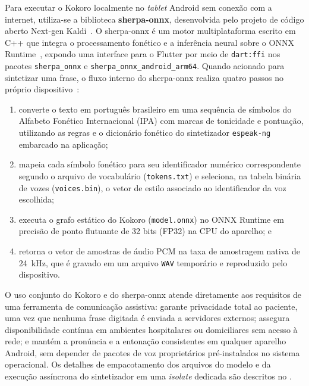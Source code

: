 Para executar o Kokoro localmente no \textit{tablet} Android sem conexão com a internet, utiliza-se a biblioteca \textbf{sherpa-onnx}, desenvolvida pelo projeto de código aberto Next-gen Kaldi~\cite{sherpa_onnx}. O sherpa-onnx é um motor multiplataforma escrito em C++ que integra o processamento fonético e a inferência neural sobre o ONNX Runtime~\cite{onnxruntime}, expondo uma interface para o Flutter por meio de \texttt{dart:ffi} nos pacotes \texttt{sherpa\_onnx} e \texttt{sherpa\_onnx\_android\_arm64}. Quando acionado para sintetizar uma frase, o fluxo interno do sherpa-onnx realiza quatro passos no próprio dispositivo~\cite{sherpa_onnx}:
\begin{enumerate}
    \item converte o texto em português brasileiro em uma sequência de símbolos do Alfabeto Fonético Internacional (IPA) com marcas de tonicidade e pontuação, utilizando as regras e o dicionário fonético do sintetizador \texttt{espeak-ng}~\cite{espeakng} embarcado na aplicação;
    \item mapeia cada símbolo fonético para seu identificador numérico correspondente segundo o arquivo de vocabulário (\texttt{tokens.txt}) e seleciona, na tabela binária de vozes (\texttt{voices.bin}), o vetor de estilo associado ao identificador da voz escolhida;
    \item executa o grafo estático do Kokoro (\texttt{model.onnx}) no ONNX Runtime em precisão de ponto flutuante de 32 bits (FP32) na CPU do aparelho; e
    \item retorna o vetor de amostras de áudio PCM na taxa de amostragem nativa de 24~kHz, que é gravado em um arquivo \texttt{WAV} temporário e reproduzido pelo dispositivo.
\end{enumerate}

O uso conjunto do Kokoro e do sherpa-onnx atende diretamente aos requisitos de uma ferramenta de comunicação assistiva: garante privacidade total ao paciente, uma vez que nenhuma frase digitada é enviada a servidores externos; assegura disponibilidade contínua em ambientes hospitalares ou domiciliares sem acesso à rede; e mantém a pronúncia e a entonação consistentes em qualquer aparelho Android, sem depender de pacotes de voz proprietários pré-instalados no sistema operacional. Os detalhes de empacotamento dos arquivos do modelo e da execução assíncrona do sintetizador em uma \textit{isolate} dedicada são descritos no .


